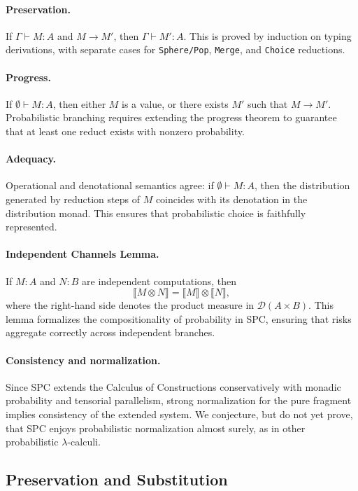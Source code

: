 \documentclass{article}
\begin{document}
\paragraph{Preservation.}
If $\Gamma \vdash M : A$ and $M \to M'$, then $\Gamma \vdash M' : A$.  
This is proved by induction on typing derivations, with separate cases for
\texttt{Sphere/Pop}, \texttt{Merge}, and \texttt{Choice} reductions.

\paragraph{Progress.}
If $\emptyset \vdash M : A$, then either $M$ is a value, or there exists $M'$
such that $M \to M'$.  
Probabilistic branching requires extending the progress theorem to guarantee
that at least one reduct exists with nonzero probability.

\paragraph{Adequacy.}
Operational and denotational semantics agree: if $\emptyset \vdash M : A$,
then the distribution generated by reduction steps of $M$ coincides with its
denotation in the distribution monad. This ensures that probabilistic choice is
faithfully represented.

\paragraph{Independent Channels Lemma.}
If $M : A$ and $N : B$ are independent computations, then
\[
  \llbracket M \otimes N \rrbracket
  = \llbracket M \rrbracket \otimes \llbracket N \rrbracket,
\]
where the right-hand side denotes the product measure in $\mathcal{D}(A \times
B)$. This lemma formalizes the compositionality of probability in SPC, ensuring
that risks aggregate correctly across independent branches.

\paragraph{Consistency and normalization.}
Since SPC extends the Calculus of Constructions conservatively with monadic
probability and tensorial parallelism, strong normalization for the pure
fragment implies consistency of the extended system. We conjecture, but do not
yet prove, that SPC enjoys probabilistic normalization almost surely, as in
other probabilistic $\lambda$-calculi.

\subsection{Preservation and Substitution}
\end{document}
